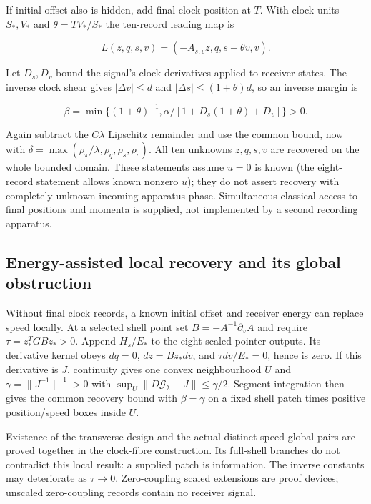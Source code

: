 \documentclass[11pt,a4paper]{article}
\begin{document}
If initial offset also is hidden, add final clock position at \(T\).
With clock units \(S_*,V_*\) and \(\theta=TV_*/S_*\) the ten-record
leading map is

\[L(z,q,s,v)=(-A_{s,v}z,q,s+\theta v,v).\]

Let \(D_s,D_v\) bound the signal's clock derivatives applied to receiver
states. The inverse clock shear gives \(|\Delta v|\le d\) and
\(|\Delta s|\le(1+\theta)d\), so an inverse margin is

\[\beta=\min\{(1+\theta)^{-1},
 \alpha/[1+D_s(1+\theta)+D_v]\}>0.\]

Again subtract the \(C\lambda\) Lipschitz remainder and use the common
bound, now with \(\delta=\max(\rho_\pi/\lambda,\rho_q,\rho_s,\rho_c)\).
All ten unknowns \(z,q,s,v\) are recovered on the whole bounded domain.
These statements assume \(u=0\) is known (the eight-record statement
allows known nonzero \(u\)); they do not assert recovery with completely
unknown incoming apparatus phase. Simultaneous classical access to final
positions and momenta is supplied, not implemented by a second recording
apparatus.

\hypertarget{energy-assisted-local-recovery-and-its-global-obstruction}{%
\subsection{Energy-assisted local recovery and its global
obstruction}\label{energy-assisted-local-recovery-and-its-global-obstruction}}

Without final clock records, a known initial offset and receiver energy
can replace speed locally. At a selected shell point set
\(B=-A^{-1}\partial_vA\) and require \(\tau=z_*^TGBz_*>0\). Append
\(H_s/E_*\) to the eight scaled pointer outputs. Its derivative kernel
obeys \(dq=0\), \(dz=Bz_*dv\), and \(\tau dv/E_*=0\), hence is zero. If
this derivative is \(J\), continuity gives one convex neighbourhood
\(U\) and \(\gamma=\|J^{-1}\|^{-1}>0\) with
\(\sup_U\|D\mathcal G_\lambda-J\|\le\gamma/2\). Segment integration then
gives the common recovery bound with \(\beta=\gamma\) on a fixed shell
patch times positive position/speed boxes inside \(U\).

Existence of the transverse design and the actual distinct-speed global
pairs are proved together in
\href{calibration-tolerance-recovery.md\#clock-fibres-and-local-versus-global-recovery}{the
clock-fibre construction}. Its full-shell branches do not contradict
this local result: a supplied patch is information. The inverse
constants may deteriorate as \(\tau\to0\). Zero-coupling scaled
extensions are proof devices; unscaled zero-coupling records contain no
receiver signal.
\end{document}
